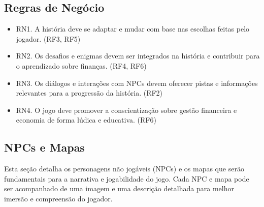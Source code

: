 \subsection{Regras de Negócio}
\begin{itemize}
	\item RN1. A história deve se adaptar e mudar com base nas escolhas feitas pelo jogador. (RF3, RF5)
	\item RN2. Os desafios e enigmas devem ser integrados na história e contribuir para o aprendizado sobre finanças. (RF4, RF6)
	\item RN3. Os diálogos e interações com NPCs devem oferecer pistas e informações relevantes para a progressão da história. (RF2)
	\item RN4. O jogo deve promover a conscientização sobre gestão financeira e economia de forma lúdica e educativa. (RF6)
\end{itemize}

\subsection{NPCs e Mapas}
Esta seção detalha os personagens não jogáveis (NPCs) e os mapas que serão fundamentais para a narrativa e jogabilidade do jogo. Cada NPC e mapa pode ser acompanhado de uma imagem e uma descrição detalhada para melhor imersão e compreensão do jogador.

